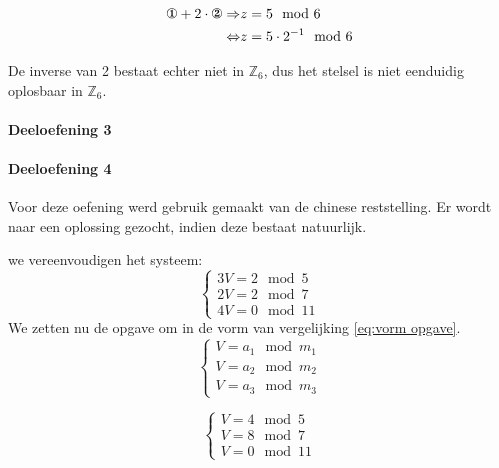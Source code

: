 \documentclass[12pt]{article}
\begin{document}

	\begin{align}
		\text{\ding{172}}+2 \cdot \text{\ding{173}} \Rightarrow & z = 5 \mod 6 \\
		\Leftrightarrow & z = 5 \cdot 2^{-1} \mod 6
	\end{align}

\par De inverse van 2 bestaat echter niet in $\mathbb{Z}_{6}$, dus het stelsel is niet eenduidig oplosbaar in $\mathbb{Z}_{6}$.

	\paragraph{Deeloefening 3}

	\paragraph{Deeloefening 4}

    Voor deze oefening werd gebruik gemaakt van de chinese reststelling. Er wordt naar een oplossing gezocht, indien deze bestaat natuurlijk.
    
    we vereenvoudigen het systeem:
	\begin{equation}
        \begin{cases}
            3V = 2 \mod 5 \\
            2V = 2 \mod 7 \\
            4V = 0 \mod 11
        \end{cases}
    \end{equation}
    We zetten nu de opgave om in de vorm van vergelijking \ref{eq:vorm opgave}.
    \begin{equation} \label{eq:vorm opgave}
        \begin{cases}
            V = a_1 \mod m_1 \\
            V = a_2 \mod m_2 \\
            V = a_3 \mod m_3
        \end{cases}
    \end{equation}
    
    \begin{equation}
        \begin{cases}
            V = 4 \mod 5 \\
            V = 8 \mod 7 \\
            V = 0 \mod 11
        \end{cases}
    \end{equation}
    
\end{document}
